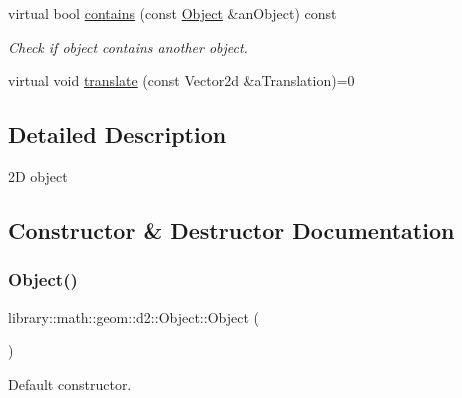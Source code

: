 \begin{DoxyCompactItemize}
virtual bool \hyperlink{classlibrary_1_1math_1_1geom_1_1d2_1_1_object_a7bc14e621db51aec72eff0fa5da295ac}{contains} (const \hyperlink{classlibrary_1_1math_1_1geom_1_1d2_1_1_object}{Object} \&an\+Object) const
\begin{DoxyCompactList}\small\item\em Check if object contains another object. \end{DoxyCompactList}\item 
virtual void \hyperlink{classlibrary_1_1math_1_1geom_1_1d2_1_1_object_a00a8bec981c21c0298af86c495fe4341}{translate} (const Vector2d \&a\+Translation)=0
\end{DoxyCompactItemize}


\subsection{Detailed Description}
2D object 

\subsection{Constructor \& Destructor Documentation}
\mbox{\label{classlibrary_1_1math_1_1geom_1_1d2_1_1_object_a35b722f64aded8d8e660074a23af237a}} 
\subsubsection{\texorpdfstring{Object()}{Object()}}
{\footnotesize\ttfamily library\+::math\+::geom\+::d2\+::\+Object\+::\+Object (\begin{DoxyParamCaption}{ }\end{DoxyParamCaption})\hspace{0.3cm}{\ttfamily [default]}}



Default constructor. 

\mbox{\label{classlibrary_1_1math_1_1geom_1_1d2_1_1_object_a092ca69d924f7226fceeb35f5532887c}} 
